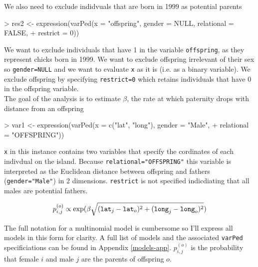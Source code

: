 \documentclass{article}
\begin{document}
We also need to exclude indidvuals that are born in 1999 as potential parents
 
\begin{Schunk}
\begin{Sinput}
> res2 <- expression(varPed(x = "offspring", gender = NULL, relational = FALSE, 
+     restrict = 0))
\end{Sinput}
\end{Schunk}

We want to exclude individuals that have 1 in the variable \texttt{offspring}, as they represent chicks born in 1999.  We want to exclude offspring irrelevant of their sex so  \texttt{gender=NULL}  and we want to evaluate \texttt{x} as it is (i.e. as a binary variable).  We exclude offspring by specifying \texttt{restrict=0} which retains individuals that have 0 in the offspring variable.\\

The goal of the analysis is to estimate $\beta$, the rate at which paternity drops with distance from an offspring

\begin{Schunk}
\begin{Sinput}
> var1 <- expression(varPed(x = c("lat", "long"), gender = "Male", 
+     relational = "OFFSPRING"))
\end{Sinput}
\end{Schunk}

\texttt{x} in this instance contains two variables that specify the cordinates of each indivdual on the island. Because \texttt{relational="OFFSPRING"} this variable is interpreted as the Euclidean distance between offspring and fathers (\texttt{gender="Male"}) in 2 dimensions.  \texttt{restrict} is not specified indicdiating that all males are potential fathers. 

\begin{equation}
p^{(o)}_{i,j} \propto \textrm{exp}(\beta \sqrt{(\textrm{\texttt{lat}}_{j}-\textrm{\texttt{lat}}_{o})^{2}+(\textrm{\texttt{long}}_{j}-\textrm{\texttt{long}}_{o})^{2}})
\label{dist-eq}
\end{equation}

The full notation for a multinomial model is cumbersome so I'll express all models in this form for clarity. A full list of models and the associated \texttt{varPed} specificiations can be found in Appendix \ref{models-app}. $p^{(o)}_{i,j}$ is the probability that female $i$ and male $j$ are the parents of offspring $o$.\\  
\end{document}
